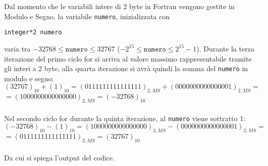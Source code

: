 Dal momento che le variabili intere di 2 byte in Fortran vengono gestite in Modulo e Segno, la variabile \texttt{numero}, inizializzata con
\begin{verbatim}
integer*2 numero
\end{verbatim}
varia tra \( -32768 \leq \texttt{numero} \leq 32767 \) (\( - 2^{15} \leq \texttt{numero} \leq 2^{15} - 1 \)). Durante la terza iterazione del primo ciclo for si arriva al valore massimo rappresentabile tramite gli interi a 2 byte, alla quarta iterazione si avrà quindi la somma del \texttt{numero} in modulo e segno:
\[
(32767)_{10}+(1)_{10} = (0111111111111111)_{2,MS} + (0000000000000001)_{2,MS} = 
\] \( 
= (1000000000000000)_{2,MS} = (-32768)_{10} 
\) \\ \\
Nel secondo ciclo for durante la quinta iterazione, al \texttt{numero} viene sottratto 1:
\[
(-32768)_{10}-(1)_{10} = (1000000000000000)_{2,MS} - (0000000000000001)_{2,MS} = 
\] \( 
= (0111111111111111)_{2,MS} = (32767)_{10} 
\) \\ \\
Da cui si spiega l'output del codice.